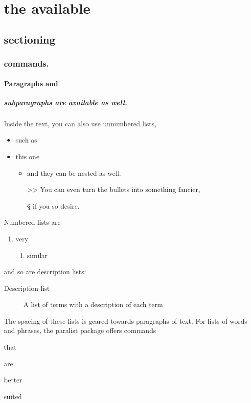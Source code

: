 \documentclass[
  digital, %
  table,   %
  lof,     %
  lot,     %
]{fithesis3}
\begin{document}
\section{the available}
\subsection{sectioning}
\subsubsection{commands.}
\paragraph{Paragraphs and}
\subparagraph{subparagraphs are available as well.}
Inside the text, you can also use unnumbered lists,
\begin{itemize}
  \item such as
  \item this one
  \begin{itemize}
    \item     and they can be nested as well.
    \item[>>] You can even turn the bullets into something fancier,
    \item[\S] if you so desire.
  \end{itemize}
\end{itemize}
Numbered lists are
\begin{enumerate}
  \item very
  \begin{enumerate}
    \item similar
  \end{enumerate}
\end{enumerate}
and so are description lists:
\begin{description}
  \item[Description list]
    A list of terms with a description of each term
\end{description}
The spacing of these lists is geared towards paragraphs of text.
For lists of words and phrases, the \textsf{paralist} package
offers commands
\begin{compactitem}
  \item that
  \begin{compactitem}
    \item are
    \begin{compactitem}
      \item better
      \begin{compactitem}
        \item suited
      \end{compactitem}
    \end{compactitem}
  \end{compactitem}
\end{compactitem}
\end{document}
